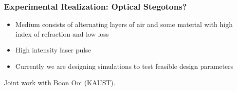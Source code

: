 \documentclass[xcolor=pst,dvipsnames]{beamer}
\begin{document}
\begin{frame} \frametitle{Experimental Realization: Optical Stegotons?}
\begin{itemize}
    \item Medium consists of alternating layers of air and some material
            with high index of refraction and low loss
    \item High intensity laser pulse
    \item Currently we are designing simulations to test feasible
            design parameters
\end{itemize}
Joint work with Boon Ooi (KAUST).
\end{frame}
\end{document}
